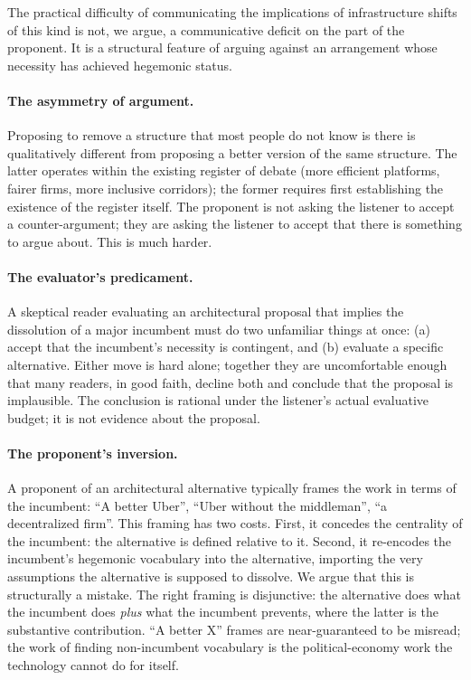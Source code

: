 \documentclass[11pt,a4paper]{article}
\theoremstyle{remark}
\begin{document}
The practical difficulty of communicating the implications of
infrastructure shifts of this kind is not, we argue, a
communicative deficit on the part of the proponent. It is a
structural feature of arguing against an arrangement whose
necessity has achieved hegemonic status.

\paragraph{The asymmetry of argument.}
Proposing to remove a structure that most people do not know is
there is qualitatively different from proposing a better version
of the same structure. The latter operates within the existing
register of debate (more efficient platforms, fairer firms, more
inclusive corridors); the former requires first establishing the
existence of the register itself. The proponent is not asking the
listener to accept a counter-argument; they are asking the
listener to accept that there is something to argue about. This is
much harder.

\paragraph{The evaluator's predicament.}
A skeptical reader evaluating an architectural proposal that
implies the dissolution of a major incumbent must do two
unfamiliar things at once: (a) accept that the incumbent's
necessity is contingent, and (b) evaluate a specific alternative.
Either move is hard alone; together they are uncomfortable enough
that many readers, in good faith, decline both and conclude that
the proposal is implausible. The conclusion is rational under the
listener's actual evaluative budget; it is not evidence about the
proposal.

\paragraph{The proponent's inversion.}
A proponent of an architectural alternative typically frames the
work in terms of the incumbent: ``A better Uber'', ``Uber without
the middleman'', ``a decentralized firm''. This framing has two
costs. First, it concedes the centrality of the incumbent: the
alternative is defined relative to it. Second, it re-encodes the
incumbent's hegemonic vocabulary into the alternative, importing
the very assumptions the alternative is supposed to dissolve. We
argue that this is structurally a mistake. The right framing is
disjunctive: the alternative does what the incumbent does
\emph{plus} what the incumbent prevents, where the latter is the
substantive contribution. ``A better X'' frames are
near-guaranteed to be misread; the work of finding non-incumbent
vocabulary is the political-economy work the technology cannot do
for itself.
\end{document}
